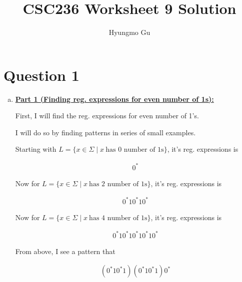 \documentclass[12pt]{article}
\begin{document}
\title{CSC236 Worksheet 9 Solution}
\author{Hyungmo Gu}
\maketitle

\section*{Question 1}

\bigskip

\begin{enumerate}[a.]
    \item


    \bigskip

    \underline{\textbf{Part 1 (Finding reg. expressions for even number of 1s):}}

    \bigskip

    First, I will find the reg. expressions for even number of 1's.

    \bigskip

    I will do so by finding patterns in series of small examples.

    \bigskip

    Starting with $L = \{x \in \Sigma \mid x\:\text{has 0 number of 1s}\}$,
    it's reg. expressions is

    \bigskip

    \begin{align}
        0^*
    \end{align}

    \bigskip

    Now for $L = \{x \in \Sigma \mid x\:\text{has 2 number of 1s}\}$,
    it's reg. expressions is

    \bigskip

    \begin{align}
        0^*10^*10^*
    \end{align}


    \bigskip

    Now for $L = \{x \in \Sigma \mid x\:\text{has 4 number of 1s}\}$,
    it's reg. expressions is

    \begin{align}
        0^*10^*10^*10^*10^*
    \end{align}

    \bigskip

    From above, I see a pattern that

    \begin{align}
        (0^*10^*1)(0^*10^*1)0^*
    \end{align}


\end{enumerate}
\end{document}
